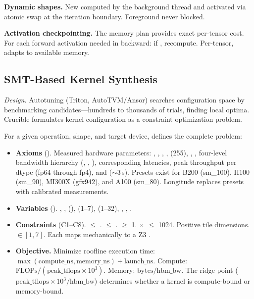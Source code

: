 \textbf{Dynamic shapes.}
New  computed by the background thread and activated via atomic swap at the iteration boundary.
Foreground never blocked.

\textbf{Activation checkpointing.}
The memory plan provides exact per-tensor cost.
For each forward activation needed in backward: if , recompute.
Per-tensor, adapts to available memory.

\subsection{SMT-Based Kernel Synthesis}

\emph{Design.}
Autotuning (Triton, AutoTVM/Ansor) searches configuration space by benchmarking candidates---hundreds to thousands of trials, finding local optima.
Crucible formulates kernel configuration as a constraint optimization problem.

For a given operation, shape, and target device,  defines the complete problem:

\begin{itemize}
  \item \textbf{Axioms} ().
    Measured hardware parameters: , , , ,  (255), , , four-level bandwidth hierarchy (, , ), corresponding latencies, peak throughput per dtype (fp64 through fp4), and  (${\sim}3$\,\textmu{}s).
    Presets exist for B200 (sm\_100), H100 (sm\_90), MI300X (gfx942), and A100 (sm\_80).
    Longitude replaces presets with calibrated measurements.
  \item \textbf{Variables} ().
    , ,  (),  (1--7),  (1--32), , , .
  \item \textbf{Constraints} (C1--C8).
     $\leq$ .
     $\leq$ .
     $\geq$ 1.
     $\times$  $\leq$ 1024.
    Positive tile dimensions.
     $\in [1,7]$.
    Each maps mechanically to a Z3 .
  \item \textbf{Objective.}
    Minimize roofline execution time: $\max(\text{compute\_ns}, \text{memory\_ns}) + \text{launch\_ns}$.
    Compute: $\text{FLOPs} / (\text{peak\_tflops} \times 10^3)$.
    Memory: $\text{bytes} / \text{hbm\_bw}$.
    The ridge point ($\text{peak\_tflops} \times 10^3 / \text{hbm\_bw}$) determines whether a kernel is compute-bound or memory-bound.
\end{itemize}

